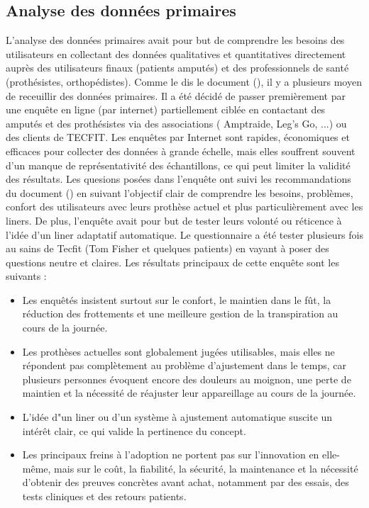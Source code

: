 \subsection{Analyse des données primaires}

L'analyse des données primaires avait pour but de comprendre les besoins des utilisateurs en collectant des données qualitatives et quantitatives directement auprès des utilisateurs finaux (patients amputés) et des professionnels de santé (prothésistes, orthopédistes). 
Comme le dis le document (\cite{ref:lambin}), il y a plusieurs moyen de receuillir des données primaires. Il a été décidé de passer premièrement par une enquête en ligne (par internet) partiellement ciblée en contactant des amputés et des prothésistes via des associations ( Amptraide, Leg's Go, ...) ou des clients de TECFIT. 
Les enquêtes par Internet sont rapides, économiques et efficaces pour collecter des données à grande échelle, mais elles souffrent souvent d'un manque de représentativité des échantillons, ce qui peut limiter la validité des résultats. Les quesions posées dans l'enquête ont suivi les recommandations du document (\cite{ref:lambin}) en suivant l'objectif clair de comprendre les besoins, problèmes, confort des utilisateurs avec leurs prothèse actuel et plus particulièrement avec les liners.
De plus, l'enquête avait pour but de tester leurs volonté ou réticence à l'idée d'un liner adaptatif automatique. Le questionnaire a été tester plusieurs fois au sains de Tecfit (Tom Fisher et quelques patients) en vayant à poser des questions neutre et claires. Les résultats principaux de cette enquête sont les suivants :
\begin{itemize}
    \item Les enquêtés insistent surtout sur le confort, le maintien dans le fût, la réduction des frottements et une meilleure gestion de la transpiration au cours de la journée.

    \item Les prothèses actuelles sont globalement jugées utilisables, mais elles ne répondent pas complètement au problème d'ajustement dans le temps, car plusieurs personnes évoquent encore des douleurs au moignon, une perte de maintien et la nécessité de réajuster leur appareillage au cours de la journée.

    \item L'idée d"un liner ou d'un système à ajustement automatique suscite un intérêt clair, ce qui valide la pertinence du concept.

    \item Les principaux freins à l'adoption ne portent pas sur l'innovation en elle-même, mais sur le coût, la fiabilité, la sécurité, la maintenance et la nécessité d'obtenir des preuves concrètes avant achat, notamment par des essais, des tests cliniques et des retours patients.
\end{itemize}

